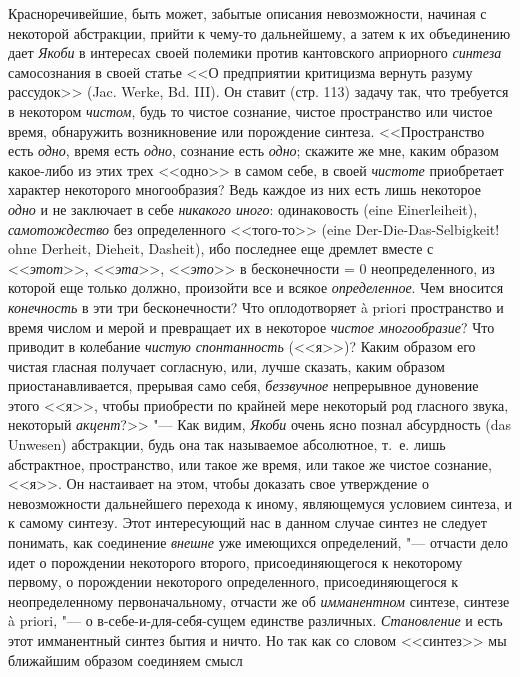 Красноречивейшие, быть может, забытые описания невозможности, начиная с
некоторой абстракции, прийти к чему-то дальнейшему, а затем к их
объединению дает {\em Якоби} в интересах своей полемики
против кантовского априорного {\em синтеза}
самосознания в своей статье <<О предприятии критицизма вернуть разуму
рассудок>> (Jac. Werke, Bd. III). Он ставит (стр. 113) задачу так, что
требуется в некотором {\em чистом}, будь то чистое
сознание, чистое пространство или чистое время, обнаружить возникновение
или порождение синтеза. <<Пространство есть {\em одно},
время есть {\em одно}, сознание есть
{\em одно}; скажите же мне, каким образом какое-либо из
этих трех <<одно>> в самом себе, в своей {\em чистоте}
приобретает характер некоторого многообразия? Ведь каждое из них есть лишь
некоторое {\em одно} и не заключает в себе
{\em никакого иного}: одинаковость (eine
Einerleiheit), {\em самотождество} без определенного
<<того-то>> (eine Der-Die-Das-Selbigkeit! ohne Derheit, Dieheit, Dasheit),
ибо последнее еще дремлет вместе с <<{\em этот}>>,
<<{\em эта}>>, <<{\em это}>> в
бесконечности = 0 неопределенного, из которой еще только должно, произойти
все и всякое {\em определенное}. Чем вносится
{\em конечность} в эти три бесконечности? Что
оплодотворяет à priori пространство и время числом и мерой и превращает их
в некоторое {\em чистое многообразие}? Что приводит в
колебание {\em чистую спонтанность} (<<я>>)? Каким
образом его чистая гласная получает согласную, или, лучше сказать, каким
образом приостанавливается, прерывая само себя,
{\em беззвучное} непрерывное дуновение этого <<я>>, чтобы
приобрести по крайней мере некоторый род гласного звука, некоторый
{\em акцент}?>> "--- Как видим,
{\em Якоби} очень ясно познал абсурдность (das Unwesen)
абстракции, будь она так называемое абсолютное, т.~е. лишь абстрактное,
пространство, или такое же время, или такое же чистое сознание, <<я>>. Он
настаивает на этом, чтобы доказать свое утверждение о невозможности
дальнейшего перехода к иному, являющемуся условием синтеза, и к самому
синтезу. Этот интересующий нас в данном случае синтез не следует понимать,
как соединение {\em внешне} уже имеющихся определений,
"--- отчасти дело идет о порождении некоторого второго, присоединяющегося к
некоторому первому, о порождении некоторого определенного,
присоединяющегося к неопределенному первоначальному, отчасти же об
{\em имманентном} синтезе, синтезе à priori, "--- о
в-себе-и-для-себя-сущем единстве различных.
{\em Становление} и есть этот имманентный синтез бытия
и ничто. Но так как со словом <<синтез>> мы ближайшим образом соединяем смысл
